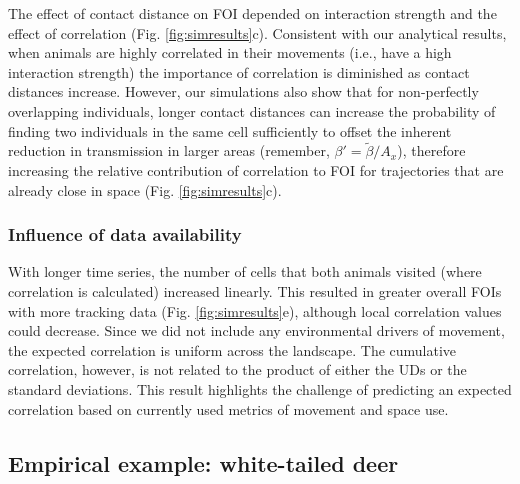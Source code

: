 \documentclass[letterpaper]{article}
\begin{document}
The effect of contact distance on FOI depended on interaction strength and the effect of correlation (Fig. \ref{fig:simresults}c). Consistent with our analytical results, when animals are highly correlated in their movements (i.e., have a high interaction strength) the importance of correlation is diminished as contact distances increase.
However, our simulations also show that for non-perfectly overlapping individuals, longer contact distances can increase the probability of finding two individuals in the same cell sufficiently to offset the inherent reduction in transmission in larger areas (remember, $\beta' = \tilde{\beta} / A_x$), therefore increasing the relative contribution of correlation to FOI for trajectories that are already close in space (Fig. \ref{fig:simresults}c).

\subsubsection*{Influence of data availability}

 
With longer time series, the number of cells that both animals visited (where correlation is calculated) increased linearly. This resulted in greater overall FOIs with more tracking data (Fig. \ref{fig:simresults}e), although local correlation values could decrease. 
Since we did not include any environmental drivers of movement, the expected correlation is uniform across the landscape. The cumulative correlation, however, is not related to the product of either the UDs or the standard deviations. This result highlights the challenge of predicting an expected correlation based on currently used metrics of movement and space use.


\subsection*{Empirical example: white-tailed deer}
\end{document}
